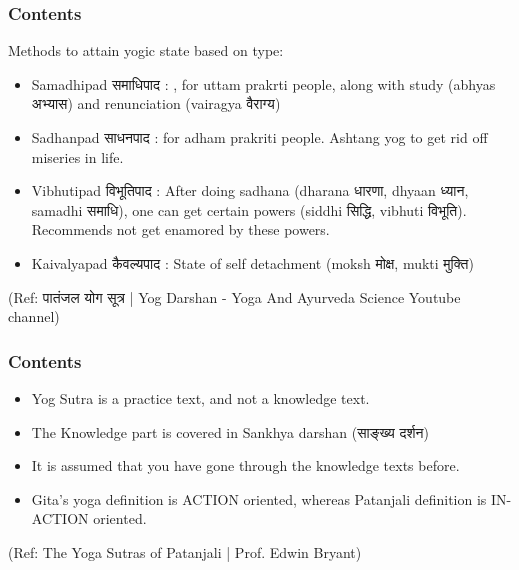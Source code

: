 \begin{frame}[fragile]\frametitle{Contents}

Methods to attain yogic state based on type:


	\begin{itemize}
	\item Samadhipad समाधिपाद : , for uttam prakrti people, along with study (abhyas अभ्यास) and renunciation (vairagya वैराग्य)
	\item Sadhanpad साधनपाद : for adham prakriti people. Ashtang yog to get rid off miseries in life.
	\item Vibhutipad विभूतिपाद : After doing sadhana (dharana धारणा, dhyaan ध्यान, samadhi समाधि), one can get certain powers (siddhi सिद्धि, vibhuti विभूति). Recommends not get enamored by these powers.
	\item Kaivalyapad कैवल्यपाद : State of self detachment (moksh मोक्ष, mukti मुक्ति)
	\end{itemize}	

\tiny{(Ref: पातंजल योग सूत्र | Yog Darshan - Yoga And Ayurveda Science Youtube channel)}

\end{frame}


\begin{frame}[fragile]\frametitle{Contents}
	\begin{itemize}
	\item Yog Sutra is a practice text, and not a knowledge text.
	\item The Knowledge part is covered in Sankhya darshan (साङ्ख्य दर्शन)
	\item It is assumed that you have gone through the knowledge texts before.
	\item Gita's yoga definition is ACTION oriented, whereas Patanjali definition is IN-ACTION oriented.
	\end{itemize}

\tiny{(Ref: The Yoga Sutras of Patanjali | Prof. Edwin Bryant)}

\end{frame}

